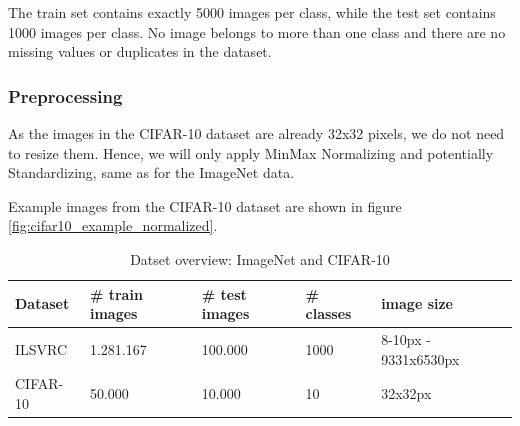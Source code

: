     The train set contains exactly 5000 images per class, while the test set contains 1000 images per class. No image belongs to more than one class and there are no missing values or duplicates in the dataset.

    \subsubsection{Preprocessing}
    As the images in the CIFAR-10 dataset are already 32x32 pixels, we do not need to resize them. Hence, we will only apply MinMax Normalizing and potentially Standardizing, same as for the ImageNet data.

    Example images from the CIFAR-10 dataset are shown in figure \ref{fig:cifar10_example_normalized}.

    \begin{table}[]
        \begin{tabular}{lllll}
        Dataset & \# train images & \# test images & \# classes & image size \\ \hline \hline
          ILSVRC  & 1.281.167    &        100.000        &      1000       &    8-10px - 9331x6530px       \\
        CIFAR-10   &        50.000     &      10.000      &    10    &     32x32px       \\ \hline \hline
        \end{tabular}
        \caption{Datset overview: ImageNet and CIFAR-10}
        \label{tab:datasets}
    \end{table}
